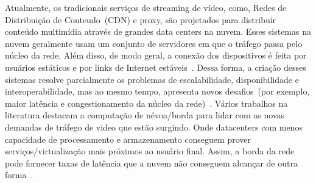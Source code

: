 Atualmente, os tradicionais serviços de streaming de vídeo, como, Redes de Distribuição de Conteudo~(CDN) e proxy, são projetados para distribuir conteúdo multimídia através de grandes data centers na nuvem. Esses sistemas na nuvem geralmente usam um conjunto de servidores em que o tráfego passa pelo núcleo da rede. Além disso, de modo geral, a conexão dos dispositivos é feita por usuários estáticos e por links de Internet estáveis~\cite{sitaraman:ACD2014}. Dessa forma, a criação desses sistemas resolve parcialmente os problemas de escalabilidade, disponibilidade e interoperabilidade, mas ao mesmo tempo, apresenta novos desafios~(por exemplo, maior latência e congestionamento da núcleo da rede)~\cite{tran:wons17,ye:ITC17,taleb:JSAC18}. Vários trabalhos na literatura destacam a computação de névoa/borda para lidar com as novas demandas de tráfego de video que estão surgindo. Onde datacenters com menos capacidade de processamento e armazenamento conseguem prover serviços/virtualização mais próximos ao usuário final. Assim, a borda da rede pode fornecer taxas de latência que a nuvem não conseguem alcançar de outra forma~\cite{gamaUCC2019, rosarioSENSORS2018}.



